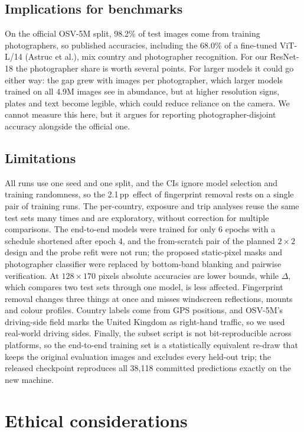 \documentclass[11pt]{article}
\newcommand{\pp}{\,pp}
\begin{document}
\subsection{Implications for benchmarks}
On the official OSV-5M split, 98.2\% of test images come from training photographers, so published
accuracies, including the 68.0\% of a fine-tuned ViT-L/14 (Astruc et al.), mix country and photographer
recognition. For our ResNet-18 the photographer share is worth several points. For larger models it could
go either way: the gap grew with images per photographer, which larger models trained on all 4.9M images
see in abundance, but at higher resolution signs, plates and text become legible, which could reduce
reliance on the camera. We cannot measure this here, but it argues for reporting photographer-disjoint accuracy alongside the official one.

\subsection{Limitations}\label{sec:limits}
All runs use one seed and one split, and the CIs ignore model selection and training randomness, so the
2.1\pp\ effect of fingerprint removal rests on a single pair of training runs. The per-country, exposure
and trip analyses reuse the same test sets many times and are exploratory, without correction for multiple
comparisons. The end-to-end models were
trained for only 6 epochs with a schedule shortened after epoch 4, and the from-scratch pair of the planned
$2\times2$ design and the probe refit were not run; the proposed static-pixel masks and photographer
classifier were replaced by bottom-band blanking and pairwise verification. At $128\times170$ pixels
absolute accuracies are lower bounds, while $\Delta$, which compares two test sets through one model, is
less affected. Fingerprint removal changes three things at once and misses windscreen reflections, mounts
and colour profiles. Country labels come from GPS positions, and OSV-5M's driving-side field marks the
United Kingdom as right-hand traffic, so we used real-world driving sides. Finally, the subset script is not
bit-reproducible across platforms, so the end-to-end training set is a statistically equivalent re-draw
that keeps the original evaluation images and excludes every held-out trip; the released checkpoint
reproduces all 38{,}118 committed predictions exactly on the new machine.

\section{Ethical considerations}
\end{document}
